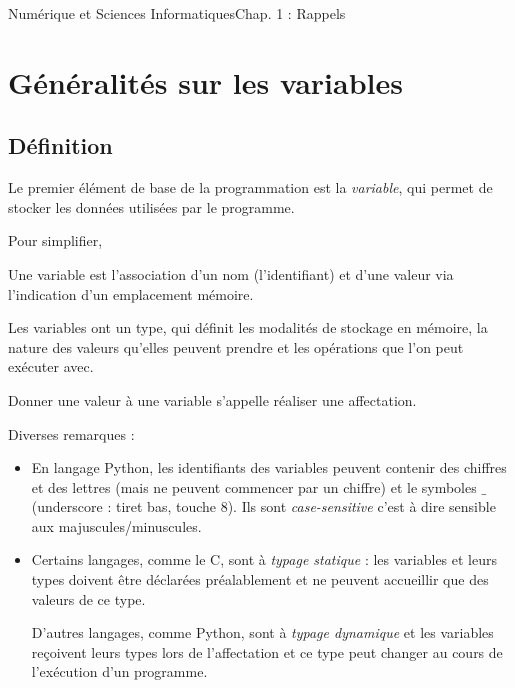 \documentclass[11pt,a4paper,french,twoside]{PMCours}
\begin{document}
{Numérique et Sciences Informatiques}{Chap. 1 : Rappels}
\section{Généralités sur les variables}
\subsection{Définition}
Le premier élément de base de la programmation est la \emph{variable}, qui permet
de stocker les données utilisées par le programme.

Pour simplifier,

\begin{Definition}{}
Une variable est l'association d'un nom (l'identifiant) et d'une valeur via 
l'indication d'un emplacement mémoire.

Les variables ont un type, qui définit les modalités de stockage en 
mémoire, la nature des valeurs qu'elles peuvent prendre et les opérations que 
l'on peut exécuter avec.

Donner une valeur à une variable s'appelle réaliser une affectation. 
\end{Definition}

\medskip
Diverses remarques : 
\begin{itemize}
	\item En langage Python, les identifiants des variables peuvent contenir des 
	chiffres et des lettres (mais ne peuvent commencer par un chiffre) et le 
	symboles $\_$ (underscore : tiret bas, touche 8). Ils sont \emph{case-sensitive} 
	c'est à dire sensible aux majuscules/minuscules.
	\item Certains langages, comme le C, sont à \emph{typage statique} : les 
	variables et leurs types doivent être déclarées préalablement et ne peuvent 
	accueillir que des valeurs de ce type.

	D'autres langages, comme Python, sont à \emph{typage dynamique} et les 
	variables reçoivent leurs types lors de l'affectation et ce type peut 
	changer au cours de l'exécution d'un programme.  
\end{itemize}
\end{document}
